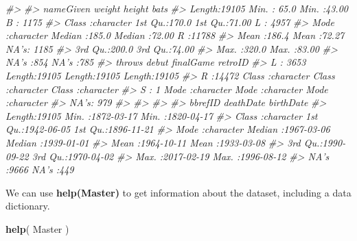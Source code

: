 \documentclass[]{book}
\newenvironment{Shaded}{\begin{snugshade}}{\end{snugshade}}
\newcommand{\CommentTok}[1]{\textcolor[rgb]{0.56,0.35,0.01}{\textit{#1}}}
\newcommand{\KeywordTok}[1]{\textcolor[rgb]{0.13,0.29,0.53}{\textbf{#1}}}
\newcommand{\NormalTok}[1]{#1}
\theoremstyle{definition}
\theoremstyle{definition}
\theoremstyle{definition}
\theoremstyle{remark}
\begin{document}
\begin{Shaded}
\begin{Highlighting}[]
\CommentTok{#>                                                          }
\CommentTok{#>   nameGiven             weight          height        bats      }
\CommentTok{#>  Length:19105       Min.   : 65.0   Min.   :43.00   B   : 1175  }
\CommentTok{#>  Class :character   1st Qu.:170.0   1st Qu.:71.00   L   : 4957  }
\CommentTok{#>  Mode  :character   Median :185.0   Median :72.00   R   :11788  }
\CommentTok{#>                     Mean   :186.4   Mean   :72.27   NA's: 1185  }
\CommentTok{#>                     3rd Qu.:200.0   3rd Qu.:74.00               }
\CommentTok{#>                     Max.   :320.0   Max.   :83.00               }
\CommentTok{#>                     NA's   :854     NA's   :785                 }
\CommentTok{#>   throws         debut            finalGame           retroID         }
\CommentTok{#>  L   : 3653   Length:19105       Length:19105       Length:19105      }
\CommentTok{#>  R   :14472   Class :character   Class :character   Class :character  }
\CommentTok{#>  S   :    1   Mode  :character   Mode  :character   Mode  :character  }
\CommentTok{#>  NA's:  979                                                           }
\CommentTok{#>                                                                       }
\CommentTok{#>                                                                       }
\CommentTok{#>                                                                       }
\CommentTok{#>    bbrefID            deathDate            birthDate         }
\CommentTok{#>  Length:19105       Min.   :1872-03-17   Min.   :1820-04-17  }
\CommentTok{#>  Class :character   1st Qu.:1942-06-05   1st Qu.:1896-11-21  }
\CommentTok{#>  Mode  :character   Median :1967-03-06   Median :1939-01-01  }
\CommentTok{#>                     Mean   :1964-10-11   Mean   :1933-03-08  }
\CommentTok{#>                     3rd Qu.:1990-09-22   3rd Qu.:1970-04-02  }
\CommentTok{#>                     Max.   :2017-02-19   Max.   :1996-08-12  }
\CommentTok{#>                     NA's   :9666         NA's   :449}
\end{Highlighting}
\end{Shaded}

We can use \textbf{help(Master)} to get information about the dataset,
including a data dictionary.

\begin{Shaded}
\begin{Highlighting}[]

\KeywordTok{help}\NormalTok{( Master )}
\end{Highlighting}
\end{Shaded}
\end{document}
